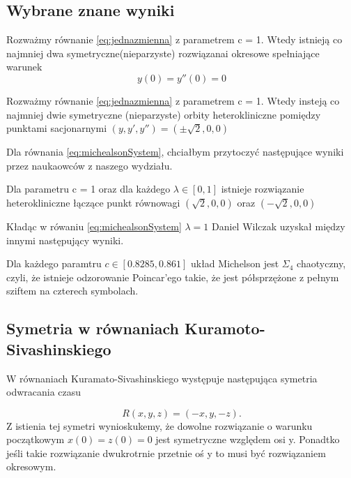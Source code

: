 \subsection{Wybrane znane wyniki} 

\begin{theorem}[Troy]
 
Rozważmy równanie \ref{eq:jednazmienna} z parametrem c = 1. Wtedy istnieją co najmniej dwa symetryczne(nieparzyste) rozwiązanai okresowe
spełniające warunek
$$
    y(0) = y''(0) = 0
$$
\end{theorem}

\begin{theorem} [Troy]
 Rozważmy równanie \ref{eq:jednazmienna} z parametrem c = 1. Wtedy insteją co najmniej dwie symetryczne (nieparzyste) orbity
 heterokliniczne pomiędzy punktami sacjonarnymi $(y,y',y'') = (\pm \sqrt{2},0,0)$
 
\end{theorem}
Dla równania \eqref{eq:michealsonSystem}, chciałbym przytoczyć następujące wyniki przez naukaowców z naszego wydziału.


\begin{theorem} 
  Dla parametru c = 1 oraz dla każdego $ \lambda \in [0,1] $ istnieje rozwiązanie heterokliniczne łączące punkt równowagi $(\sqrt{2},0,0) $ 
  oraz $(-\sqrt{2},0,0)$
 
\end{theorem}

Kładąc w rówaniu \eqref{eq:michealsonSystem} $ \lambda = 1 $
Daniel Wilczak uzyskał między innymi następujący wyniki.

\begin{theorem}[Wilczak]
  Dla każdego paramtru $ c \in [0.8285,0.861] $ układ Michelson jest $ \Sigma_4 $ chaotyczny,
  czyli, że istnieje odzorowanie Poincar'ego takie, że jest półsprzężone z pełnym sziftem na czterech symbolach.
\end{theorem}


\subsection{Symetria w równaniach Kuramoto-Sivashinskiego}

W równaniach Kuramato-Sivashinskiego występuje następująca symetria odwracania czasu 

$$
  R(x,y,z) = (-x,y,-z).
$$
Z istienia tej symetri wynioskukemy, że dowolne rozwiązanie o warunku początkowym $x(0) = z(0) = 0 $ 
jest symetryczne względem osi y. Ponadtko jeśli takie rozwiązanie dwukrotrnie przetnie oś y to musi być rozwiązaniem okresowym.



